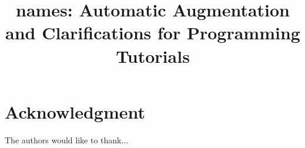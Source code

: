 \documentclass[conference]{IEEEtran}
\begin{document}
\title{\Glspl{name}: Automatic Augmentation and Clarifications for Programming Tutorials}

\author{
\and
{}
}

\maketitle



\IEEEpeerreviewmaketitle




% 






\section*{Acknowledgment}
The authors would like to thank...




\end{document}
